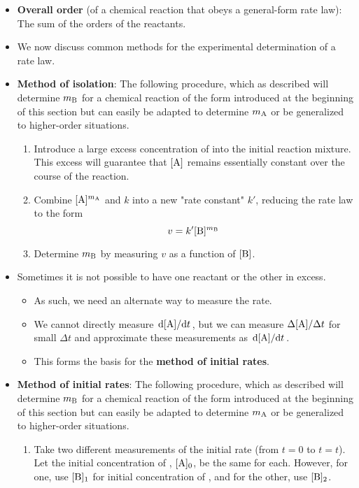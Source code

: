 \documentclass[../notes.tex]{subfiles}
\begin{document}
\begin{itemize}
    \item \textbf{Overall order} (of a chemical reaction that obeys a general-form rate law): The sum of the orders of the reactants.
    \item We now discuss common methods for the experimental determination of a rate law.
    \item \textbf{Method of isolation}: The following procedure, which as described will determine $m_{\ce{B}}$ for a chemical reaction of the form introduced at the beginning of this section but can easily be adapted to determine $m_{\ce{A}}$ or be generalized to higher-order situations.
    \begin{enumerate}
        \item Introduce a large excess concentration of  into the initial reaction mixture. This excess will guarantee that $[\ce{A}]$ remains essentially constant over the course of the reaction.
        \item Combine $[\ce{A}]^{m_{\ce{A}}}$ and $k$ into a new "rate constant" $k'$, reducing the rate law to the form
        \begin{equation*}
            v = k'[\ce{B}]^{m_{\ce{B}}}
        \end{equation*}
        \item Determine $m_{\ce{B}}$ by measuring $v$ as a function of $[\ce{B}]$.
    \end{enumerate}
    \item Sometimes it is not possible to have one reactant or the other in excess.
    \begin{itemize}
        \item As such, we need an alternate way to measure the rate.
        \item We cannot directly measure $\dv*{[\ce{A}]}{t}$, but we can measure $\Delta[\ce{A}]/\Delta t$ for small $\Delta t$ and approximate these measurements as $\dv*{[\ce{A}]}{t}$.
        \item This forms the basis for the \textbf{method of initial rates}.
    \end{itemize}
    \item \textbf{Method of initial rates}: The following procedure, which as described will determine $m_{\ce{B}}$ for a chemical reaction of the form introduced at the beginning of this section but can easily be adapted to determine $m_{\ce{A}}$ or be generalized to higher-order situations.
    \begin{enumerate}
        \item Take two different measurements of the initial rate (from $t=0$ to $t=t$). Let the initial concentration of , $[\ce{A}]_0$, be the same for each. However, for one, use $[\ce{B}]_1$ for initial concentration of , and for the other, use $[\ce{B}]_2$.

\end{enumerate}
\end{itemize}
\end{document}

